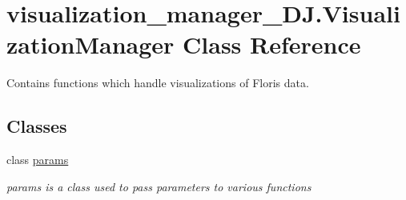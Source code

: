 \hypertarget{classvisualization__manager___d_j_1_1_visualization_manager}{}\section{visualization\+\_\+manager\+\_\+\+D\+J.\+Visualization\+Manager Class Reference}
\label{classvisualization__manager___d_j_1_1_visualization_manager}


Contains functions which handle visualizations of Floris data.  


\subsection*{Classes}
\begin{DoxyCompactItemize}
\item 
class \mbox{\hyperlink{classvisualization__manager___d_j_1_1_visualization_manager_1_1params}{params}}
\begin{DoxyCompactList}\small\item\em params is a class used to pass parameters to various functions \end{DoxyCompactList}\end{DoxyCompactItemize}
